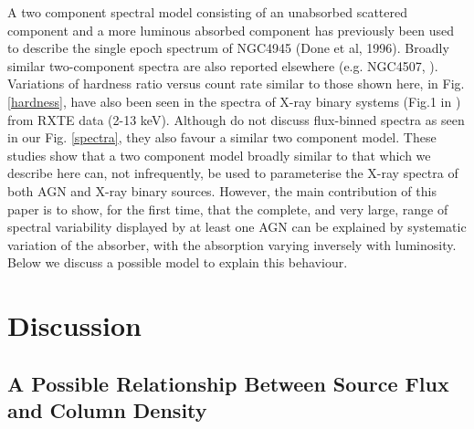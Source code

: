 \documentclass[useAMS,usenatbib]{sam}
\begin{document}

A two component spectral model consisting of an unabsorbed scattered component and a more luminous absorbed component has previously been used to describe the single
epoch spectrum of NGC4945 (Done et al, 1996). Broadly similar two-component spectra are also reported elsewhere (e.g. NGC4507, \citet{braito}). Variations of hardness
ratio versus count rate similar to those shown here, in Fig. \ref{hardness}, have also been seen in the spectra of X-ray binary systems (Fig.1 in \citet{kuulkers}) from
RXTE data (2-13 keV). Although	\citet{kuulkers} do not discuss flux-binned spectra as seen in our Fig. \ref{spectra}, they also favour a similar two component model.
These studies show that a two component model broadly similar to that which we describe here can, not infrequently, be used to parameterise the X-ray spectra of both AGN
and X-ray binary sources. However, the main contribution of this paper is to show, for the first time, that the complete, and very large, range of spectral variability
displayed by at least one AGN can be explained by systematic variation of the absorber, with the absorption varying inversely with luminosity. Below we discuss a possible
model to explain this behaviour. 


\section{Discussion}


\subsection{A Possible Relationship Between Source Flux and Column Density}
	
\end{document}
